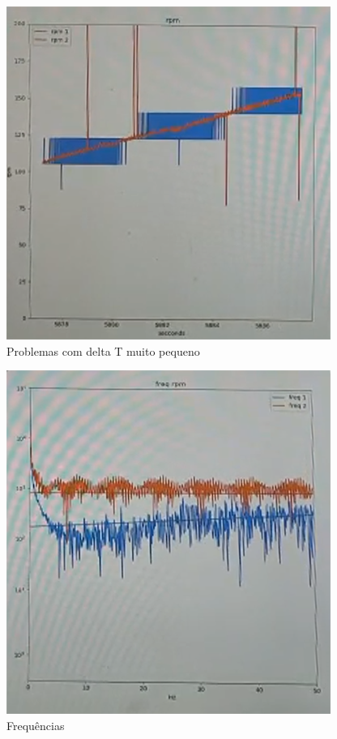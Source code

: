 \begin{figure}[h]
    \centering
    \includegraphics{figures/medidas_altas}
    \caption{Problemas com delta T muito pequeno}
    \label{fig:medidas_altas}
\end{figure}

\begin{figure}[h]
    \centering
    \includegraphics{figures/frequencia_medidas_altas}
    \caption{Frequências}
    \label{fig:frequencia_medidas_altas}
\end{figure}

